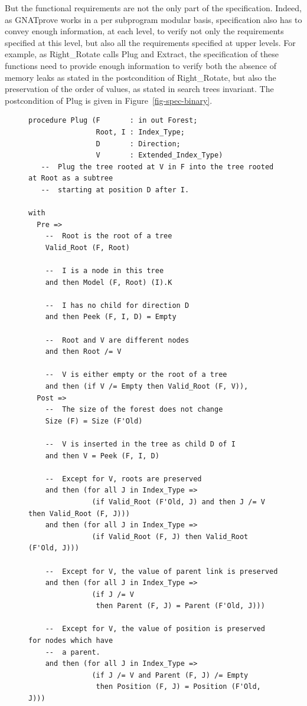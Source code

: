 \documentclass[11pt,a4paper]{article}
\begin{document}
But the functional requirements are not the only part of the specification. Indeed, as GNATprove works in a per
subprogram modular basis, specification also has to convey enough information, at each level, to verify not only the
requirements specified at this level, but also all the requirements specified at upper levels. For example, as
Right\_Rotate calls Plug and Extract, the specification of these functions need to provide enough information to
verify both the absence of memory leaks as stated in the postcondition of Right\_Rotate, but also the preservation of
the order of values, as stated in search trees invariant. The postcondition of Plug is given in
Figure~\ref{fig-spec-binary}.

\begin{figure}
\begin{small}
\begin{lstlisting}
procedure Plug (F       : in out Forest;
                Root, I : Index_Type;
                D       : Direction;
                V       : Extended_Index_Type)
   --  Plug the tree rooted at V in F into the tree rooted at Root as a subtree
   --  starting at position D after I.

with
  Pre =>
    --  Root is the root of a tree
    Valid_Root (F, Root)

    --  I is a node in this tree
    and then Model (F, Root) (I).K

    --  I has no child for direction D
    and then Peek (F, I, D) = Empty

    --  Root and V are different nodes
    and then Root /= V

    --  V is either empty or the root of a tree
    and then (if V /= Empty then Valid_Root (F, V)),
  Post =>
    --  The size of the forest does not change
    Size (F) = Size (F'Old)

    --  V is inserted in the tree as child D of I
    and then V = Peek (F, I, D)

    --  Except for V, roots are preserved
    and then (for all J in Index_Type =>
               (if Valid_Root (F'Old, J) and then J /= V then Valid_Root (F, J)))
    and then (for all J in Index_Type =>
               (if Valid_Root (F, J) then Valid_Root (F'Old, J)))

    --  Except for V, the value of parent link is preserved
    and then (for all J in Index_Type =>
               (if J /= V
                then Parent (F, J) = Parent (F'Old, J)))

    --  Except for V, the value of position is preserved for nodes which have
    --  a parent.
    and then (for all J in Index_Type =>
               (if J /= V and Parent (F, J) /= Empty
                then Position (F, J) = Position (F'Old, J)))


\end{lstlisting}
\end{small}
\end{figure}
\end{document}
